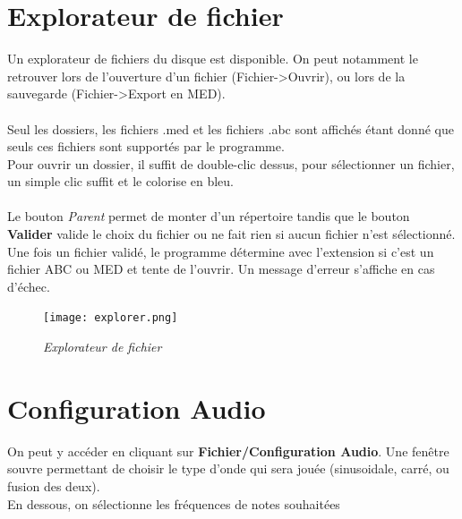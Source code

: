 \documentclass[12pt]{report}
\begin{document}
\section{Explorateur de fichier}
Un explorateur de fichiers du disque est disponible. On peut notamment le retrouver lors de l'ouverture d'un fichier (Fichier->Ouvrir), ou lors de la sauvegarde (Fichier->Export en MED).\\\\
Seul les dossiers, les fichiers .med et les fichiers .abc sont affichés étant donné que seuls ces fichiers sont supportés par le programme.\\
Pour ouvrir un dossier, il suffit de double-clic dessus, pour sélectionner un fichier, un simple clic suffit et le colorise en bleu.\\ \\
Le bouton \textit{Parent} permet de monter d'un répertoire tandis que le bouton \textbf{Valider} valide le choix du fichier ou ne fait rien si aucun fichier n'est sélectionné.\\
Une fois un fichier validé, le programme détermine avec l'extension si c'est un fichier ABC ou MED et tente de l'ouvrir. Un message d'erreur s'affiche en cas d'échec.\\
\begin{figure}[H]
  \centering
  \texttt{[image: explorer.png]}\\
    \caption{\textit{Explorateur de fichier}}
\end{figure}
\vskip 0.2in

\section{Configuration Audio}
On peut y accéder en cliquant sur \textbf{Fichier/Configuration Audio}. Une fenêtre souvre permettant de choisir le type d'onde qui sera jouée (sinusoidale, carré, ou fusion des deux).\\
En dessous, on sélectionne les fréquences de notes souhaitées
\end{document}
